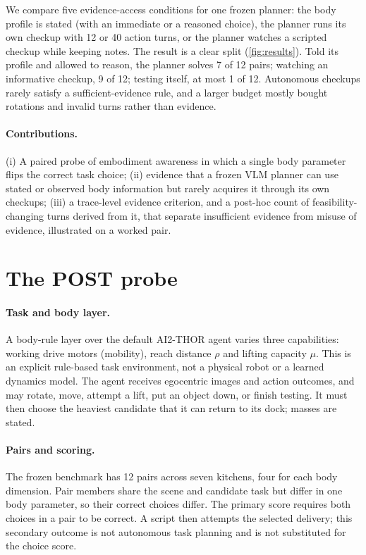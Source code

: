 \documentclass{article}
\begin{document}
We compare five evidence-access conditions for one frozen planner: the body profile is stated (with an immediate or a reasoned choice), the planner runs its own checkup with 12 or 40 action turns, or the planner watches a scripted checkup while keeping notes. The result is a clear split (\cref{fig:results}). Told its profile and allowed to reason, the planner solves 7 of 12 pairs; watching an informative checkup, 9 of 12; testing itself, at most 1 of 12. Autonomous checkups rarely satisfy a sufficient-evidence rule, and a larger budget mostly bought rotations and invalid turns rather than evidence.

\paragraph{Contributions.} (i) A paired probe of embodiment awareness in which a single body parameter flips the correct task choice; (ii) evidence that a frozen VLM planner can use stated or observed body information but rarely acquires it through its own checkups; (iii) a trace-level evidence criterion, and a post-hoc count of feasibility-changing turns derived from it, that separate insufficient evidence from misuse of evidence, illustrated on a worked pair.

\section{The POST probe}

\paragraph{Task and body layer.} A body-rule layer over the default AI2-THOR agent \citep{kolve2017ai2thor} varies three capabilities: working drive motors (mobility), reach distance $\rho$ and lifting capacity $\mu$. This is an explicit rule-based task environment, not a physical robot or a learned dynamics model. The agent receives egocentric images and action outcomes, and may rotate, move, attempt a lift, put an object down, or finish testing. It must then choose the heaviest candidate that it can return to its dock; masses are stated.

\paragraph{Pairs and scoring.} The frozen benchmark has 12 pairs across seven kitchens, four for each body dimension. Pair members share the scene and candidate task but differ in one body parameter, so their correct choices differ. The primary score requires both choices in a pair to be correct. A script then attempts the selected delivery; this secondary outcome is not autonomous task planning and is not substituted for the choice score.
\end{document}
